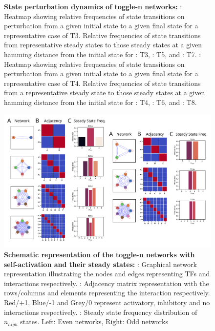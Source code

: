 \documentclass[11pt,a4paper]{article}
\theoremstyle{definition}
\theoremstyle{remark}
\begin{document}
\begin{figure}[h]
    \caption{\textbf{State perturbation dynamics of toggle-n networks:} : Heatmap showing relative frequencies of state transitions on perturbation from a given initial state to a given final state for a representative case of T3. Relative frequencies of state transitions from representative steady states to those steady states at a given hamming distance from the initial state for : T3, : T5, and : T7. : Heatmap showing relative frequencies of state transitions on perturbation from a given initial state to a given final state for a representative case of T4. Relative frequencies of state transitions from a representative steady state to those steady states at a given hamming distance from the initial state for : T4, : T6, and : T8.}
    \label{stg}
\end{figure}

\begin{figure}[h]
    \begin{subfigure}[c]{\textwidth}
        \label{graph-sa}
    \end{subfigure}
    \begin{subfigure}[c]{\textwidth}
        \label{adjmat-sa}
    \end{subfigure}
    \begin{subfigure}[c]{\textwidth}
        \label{ssfreq-sa}
    \end{subfigure}
    \centering
    \includegraphics[width=\textwidth]{figures/FigureS1}
    \caption{\textbf{Schematic representation of the toggle-n networks with self-activation and their steady states:} : Graphical network representation illustrating the nodes and edges representing TFs and interactions respectively. : Adjacency matrix representation with the rows/columns and elements representing the interaction respectively. Red/+1, Blue/-1 and Grey/0 represent activatory, inhibitory and no interactions respectively. : Steady state frequency distribution of $n_{high}$ states. Left: Even networks, Right: Odd networks}
    \label{networks-sa}
\end{figure}
\end{document}

